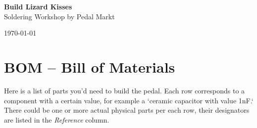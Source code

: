 \documentclass[a4paper,12pt]{article}
\begin{document}
\begin{titlepage}
  \begin{center}
    \Large\textbf{Build Lizard Kisses}\\
    \large{Soldering Workshop by Pedal Markt}
  \end{center}
  \vspace*{\fill}
  \begin{center}
    \today
  \end{center}
\end{titlepage}
\section{BOM – Bill of Materials}

Here is a list of parts you'd need to build the pedal.
Each row corresponds to a component with a certain value,
for example a `ceramic capacitor with value 1nF.` There could
be one or more actual physical parts per each row,
their designators are listed in the \textit{Reference}
column.

\end{document}

